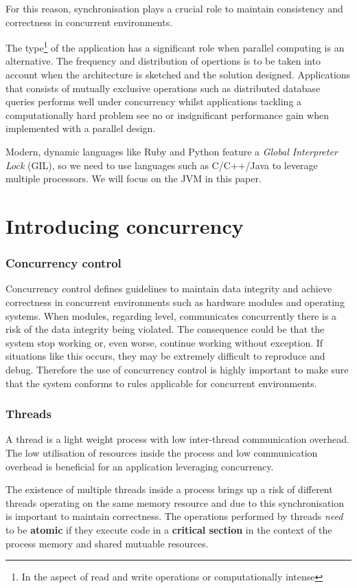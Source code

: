 \documentclass[a4paper,12pt]{kth-mag}
\begin{document}
For this reason, synchronisation plays a crucial role to maintain consistency and correctness in concurrent environments.

The type\footnote{In the aspect of read and write operations or computationally intense} of the application has a significant role when parallel computing is an alternative. The frequency and distribution of opertions is to be taken into account when the architecture is sketched and the solution designed. Applications that consists of mutually exclusive operations such as distributed database queries performs well under concurrency whilst applications tackling a computationally hard problem see no or insignificant performance gain when implemented with a parallel design.

Modern, dynamic languages like Ruby and Python feature a \textit{Global Interpreter Lock} (GIL), so we need to use languages such as C/C++/Java to leverage multiple processors. We will focus on the JVM in this paper.  

\part{Introducing concurrency}

\section{Concurrency control} \label{sec:con_con}
Concurrency control defines guidelines to maintain data integrity and achieve correctness in concurrent environments such as hardware modules and operating systems\cite{concon}. When modules, regarding level, communicates concurrently there is a risk of the data integrity being violated. The consequence could be that the system stop working or, even worse, continue working without exception. If situations like this occurs, they may be extremely difficult to reproduce and debug. Therefore the use of concurrency control is highly important to make sure that the system conforms to rules applicable for concurrent environments.

\section{Threads}
A thread is a light weight process with low inter-thread communication overhead. The low utilisation of resources inside the process and low communication overhead is beneficial for an application leveraging concurrency. 

The existence of multiple threads inside a process brings up a risk of different threads operating on the same memory resource and due to this synchronisation is important to maintain correctness. The operations performed by threads \textit{need} to be \textbf{atomic} if they execute code in a \textbf{critical section} in the context of the process memory and shared mutuable resources.
\end{document}
